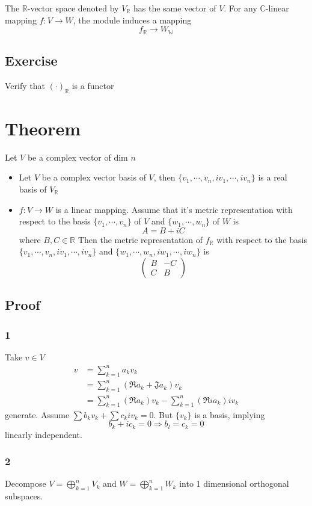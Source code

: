 \documentclass{book}
\begin{document}
The $\mathbb{R}$-vector space denoted by $V_\mathbb{R}$ has the same vector of $V$. For any $\mathbb{C}$-linear mapping $f:V\rightarrow W$, the module induces a mapping $$f_\mathbb{R}\rightarrow W_\mathbb{W}$$
\subsection*{Exercise}Verify that $(\cdot)_\mathbb{R}$ is a functor
\section{Theorem}
Let $V$ be a complex vector of dim $n$
\begin{itemize}
    \item Let $V$ be a complex vector basis of $V$, then $\{v_1,\cdots, v_n,iv_1,\cdots, iv_n\}$ is a real basis of $V_\mathbb{R}$
    \item $f:V\rightarrow W$ is a linear mapping. Assume that it's metric representation with respect to the basis $\{v_1,\cdots, v_n\}$ of $V$ and $\{w_1,\cdots, w_n\}$ of $W$ is $$A=B+iC$$
    where $B,C\in\mathbb{R}$ Then the metric representation of $f_\mathbb{R}$ with respect to the basis $\{v_1,\cdots, v_n,iv_1,\cdots, iv_n\}$ and $\{w_1,\cdots, w_n,iw_1,\cdots, iw_n\}$ is$$\begin{pmatrix}
        B&-C\\C&B
    \end{pmatrix}$$
\end{itemize}
\subsection*{Proof}
\subsubsection{1}
Take $v\in V$
$$\begin{aligned}
    v&=\sum\limits_{k=1}^na_kv_k\\
    &=\sum\limits_{k=1}^n(\mathfrak{R}a_k+\mathfrak{J}a_k)v_k\\
    &=\sum\limits_{k=1}^n(\mathfrak{R}a_k)v_k-\sum\limits_{k=1}^n(\mathfrak{R}ia_k)iv_k
\end{aligned}$$generate.
Assume $\sum b_kv_k+\sum c_kiv_k=0$. But $\{v_k\}$ is a basis, implying $$b_k+ic_k=0\Rightarrow b_l=c_k=0$$
linearly independent.
\subsubsection{2}
Decompose $V=\bigoplus\limits_{k=1}^nV_k$ and $W=\bigoplus\limits_{k=1}^nW_k$ into 1 dimensional orthogonal subspaces.
\end{document}
